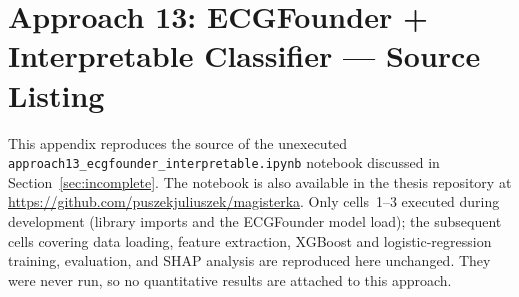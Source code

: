 \appendix

\chapter{Approach 13: ECGFounder + Interpretable Classifier --- Source Listing}
\label{app:approach13}

This appendix reproduces the source of the unexecuted
\texttt{approach13\_ecgfounder\_interpretable.ipynb} notebook
discussed in Section~\ref{sec:incomplete}. The notebook is also
available in the thesis repository at
\url{https://github.com/puszekjuliuszek/magisterka}. Only cells~1--3
executed during development (library imports and the ECGFounder
model load); the subsequent cells covering data loading, feature
extraction, XGBoost and logistic-regression training, evaluation, and
SHAP analysis are reproduced here unchanged. They were never run,
so no quantitative results are attached to this approach.


